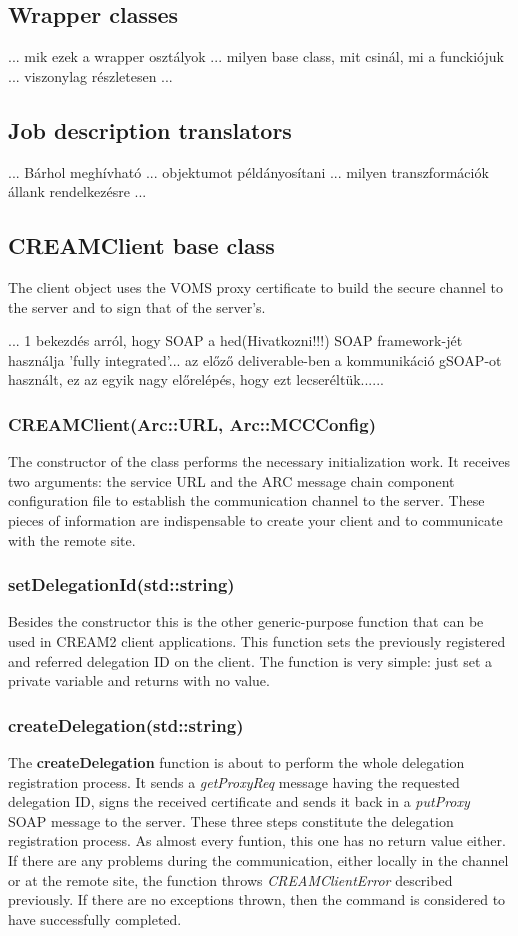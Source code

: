 \documentclass{article}
\begin{document}
\subsection{Wrapper classes}
... mik ezek a wrapper osztályok ... milyen base class, mit csinál, mi a funckiójuk ... viszonylag részletesen ...
\subsection{Job description translators}
... Bárhol meghívható ... objektumot példányosítani ... milyen transzformációk állank rendelkezésre ...
\subsection{CREAMClient base class}
\label{CREAMClient}
The client object uses the VOMS proxy certificate to build the secure channel to the server and to sign that of the server's.\par
... 1 bekezdés arról, hogy SOAP a hed(Hivatkozni!!!) SOAP framework-jét használja 'fully integrated'... az előző deliverable-ben a kommunikáció gSOAP-ot használt, ez az egyik nagy előrelépés, hogy ezt lecseréltük...\cite{gsoap}... 
\subsubsection*{CREAMClient(Arc::URL, Arc::MCCConfig)}
The constructor of the class performs the necessary initialization work. It receives two arguments: the service URL and the ARC message chain component configuration file to establish the communication channel to the server. These pieces of information are indispensable to create your client and to communicate with the remote site.
\subsubsection*{setDelegationId(std::string)}
Besides the constructor this is the other generic-purpose function that can be used in CREAM2 client applications. This function sets the previously registered and referred delegation ID on the client. The function is very simple: just set a private variable and returns with no value.
\subsubsection*{createDelegation(std::string)}
The \textbf{createDelegation} function is about to perform the whole delegation registration process. It sends a \textit{getProxyReq} message having the requested delegation ID, signs the received certificate and sends it back in a \textit{putProxy} SOAP message to the server. These three steps constitute the delegation registration process.
As almost every funtion, this one has no return value either. If there are any problems during the communication, either locally in the channel or at the remote site, the function throws \textit{CREAMClientError} described previously. If there are no exceptions thrown, then the command is considered to have successfully completed.
\end{document}
